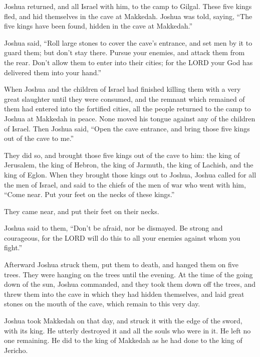  Joshua returned, and all Israel with him, to the camp to
Gilgal.  These five kings fled, and hid themselves in the
cave at Makkedah.  Joshua was told, saying, ``The five
kings have been found, hidden in the cave at Makkedah.''

 Joshua said, ``Roll large stones to cover the cave's
entrance, and set men by it to guard them;  but don't stay
there. Pursue your enemies, and attack them from the rear. Don't allow
them to enter into their cities; for the LORD your God has delivered
them into your hand.''

 When Joshua and the children of Israel had finished
killing them with a very great slaughter until they were consumed, and
the remnant which remained of them had entered into the fortified
cities,  all the people returned to the camp to Joshua at
Makkedah in peace. None moved his tongue against any of the children of
Israel.  Then Joshua said, ``Open the cave entrance, and
bring those five kings out of the cave to me.''

 They did so, and brought those five kings out of the cave
to him: the king of Jerusalem, the king of Hebron, the king of Jarmuth,
the king of Lachish, and the king of Eglon.  When they
brought those kings out to Joshua, Joshua called for all the men of
Israel, and said to the chiefs of the men of war who went with him,
``Come near. Put your feet on the necks of these kings.''

They came near, and put their feet on their necks.

 Joshua said to them, ``Don't be afraid, nor be dismayed.
Be strong and courageous, for the LORD will do this to all your enemies
against whom you fight.''

 Afterward Joshua struck them, put them to death, and
hanged them on five trees. They were hanging on the trees until the
evening.  At the time of the going down of the sun, Joshua
commanded, and they took them down off the trees, and threw them into
the cave in which they had hidden themselves, and laid great stones on
the mouth of the cave, which remain to this very day.

 Joshua took Makkedah on that day, and struck it with the
edge of the sword, with its king. He utterly destroyed it and all the
souls who were in it. He left no one remaining. He did to the king of
Makkedah as he had done to the king of Jericho.

